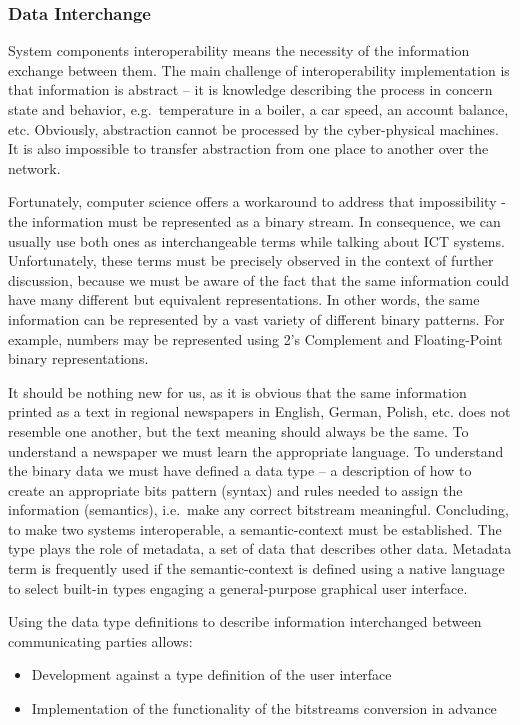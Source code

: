 \documentclass{jacsart}
\providecommand{\tightlist} { \setlength{\itemsep}{0pt}\setlength{\parskip}{0pt}}
\begin{document}
\hypertarget{data-interchange}{%
  \subsubsection{Data Interchange}\label{data-interchange}}

System components interoperability means the necessity of the
information exchange between them. The main challenge of
interoperability implementation is that information is abstract -- it is
knowledge describing the process in concern state and behavior,
e.g.~temperature in a boiler, a car speed, an account balance, etc.
Obviously, abstraction cannot be processed by the cyber-physical
machines. It is also impossible to transfer abstraction from one place
to another over the network.

Fortunately, computer science offers a workaround to address that
impossibility - the information must be represented as a binary stream.
In consequence, we can usually use both ones as interchangeable terms
while talking about ICT systems. Unfortunately, these terms must be
precisely observed in the context of further discussion, because we must
be aware of the fact that the same information could have many different
but equivalent representations. In other words, the same information can
be represented by a vast variety of different binary patterns. For
example, numbers may be represented using 2's Complement and
Floating-Point binary representations.

It should be nothing new for us, as it is obvious that the same
information printed as a text in regional newspapers in English, German,
Polish, etc. does not resemble one another, but the text meaning should
always be the same. To understand a newspaper we must learn the
appropriate language. To understand the binary data we must have defined
a data type -- a description of how to create an appropriate bits
pattern (syntax) and rules needed to assign the information (semantics),
i.e.~make any correct bitstream meaningful. Concluding, to make two
systems interoperable, a semantic-context must be established. The type
plays the role of metadata, a set of data that describes other data.
Metadata term is frequently used if the semantic-context is defined
using a native language to select built-in types engaging a
general-purpose graphical user interface.

Using the data type definitions to describe information interchanged
between communicating parties allows:

\begin{itemize}
  \tightlist
  \item
        Development against a type definition of the user interface
  \item
        Implementation of the functionality of the bitstreams conversion in
        advance
\end{itemize}
\end{document}
